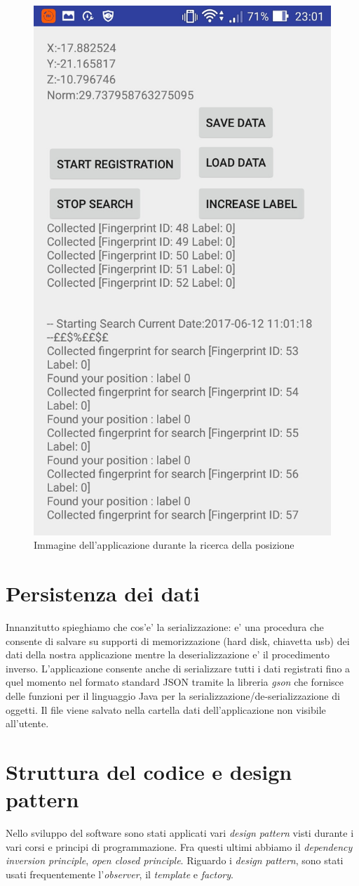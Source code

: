 \begin{figure}[H]
	\centering
	\includegraphics[width=0.7\linewidth]{img/app2}
	\caption{Immagine dell'applicazione durante la ricerca della posizione}
	\label{fig:app2}
\end{figure}


\section{Persistenza dei dati}
Innanzitutto spieghiamo che cos'e' la serializzazione: e' una procedura che consente di salvare su supporti di memorizzazione (hard disk, chiavetta usb) dei dati della nostra applicazione mentre la deserializzazione e' il procedimento inverso.
L'applicazione consente anche di serializzare tutti i dati registrati fino a quel momento nel formato standard JSON tramite la libreria \textit{gson} che fornisce delle funzioni  per il linguaggio Java per la serializzazione/de-serializzazione di oggetti. Il file viene salvato nella cartella dati dell'applicazione non visibile all'utente.

\section{Struttura del codice e design pattern}
Nello sviluppo del software sono stati applicati vari \textit{design pattern} visti durante i vari corsi e principi di programmazione. Fra questi ultimi abbiamo il \textit{dependency inversion principle}, \textit{open closed principle}. Riguardo i \textit{design pattern}, sono stati usati frequentemente l'\textit{observer}, il \textit{template} e \textit{factory}.


